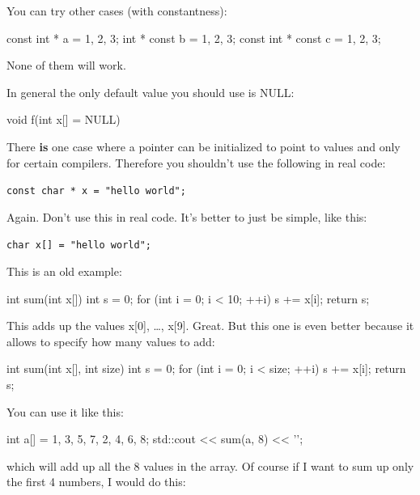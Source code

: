 You can try other cases (with constantness):

\begin{consolethree}[escapeinside=||]
const int * a = {1, 2, 3};
int * const b = {1, 2, 3};
const int * const c = {1, 2, 3};
\end{consolethree}

None of them will work.

In general the only default value you should use is NULL:

\begin{consolethree}[escapeinside=||]
void f(int x[] = NULL)
{}
\end{consolethree}

There \textbf{is} one case where a pointer can be initialized to
point to values and only for certain compilers. Therefore you
shouldn't use the following in real code:

\verb!const char * x = "hello world";!

Again. Don't use this in real code. It's
better to just be simple, like this:

\verb!char x[] = "hello world";!


\newpage{}

This is an old example:

\begin{consolethree}[escapeinside=||]
int sum(int x[])
{
    int s = 0;
    for (int i = 0; i < 10; ++i)
    {
        s += x[i];
    }
    return s;
}
\end{consolethree}

This adds up the values x[0], \ldots, x[9]. Great. But this one
is even better because it allows to specify how many values to add:

\begin{consolethree}[escapeinside=||]
int sum(int x[], int size)
{
    int s = 0;
    for (int i = 0; i < size; ++i)
    {
        s += x[i];
    }
    return s;
}
\end{consolethree}

You can use it like this:

\begin{consolethree}[escapeinside=||]
int a[] = {1, 3, 5, 7, 2, 4, 6, 8};
std::cout << sum(a, 8) << '\n';
\end{consolethree}

which will add up all the 8 values in the array. Of course if I want to
sum up only the first 4 numbers, I would do this:

